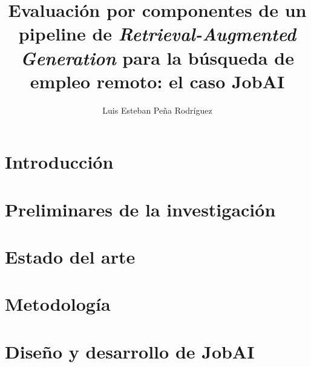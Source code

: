 \documentclass[12pt,openany]{MIA-USA}
\title{Evaluaci\'on por componentes de un pipeline de \textit{Retrieval-Augmented Generation} para la b\'usqueda de empleo remoto: el caso JobAI}
\author{Luis Esteban Pe\~na Rodr\'iguez}
\begin{document}
	
	\maketitle
 	
	
    
    \tableofcontents
    \listoffigures
    \listoftables
    
    
    
    
    \chapter{Introducci\'on}
    
    
    \chapter{Preliminares de la investigaci\'on}
    \label{cap:problema}
    
    
    \chapter{Estado del arte}
    \label{cap:estado-arte}
    
    
    \chapter{Metodolog\'ia}
    \label{cap:metodologia}
    
    
    \chapter{Dise\~no y desarrollo de JobAI}
    \label{cap:artefacto}
    
    
\end{document}
